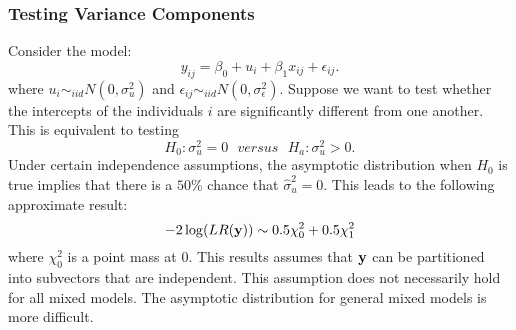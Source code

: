 \subsubsection{Testing Variance Components}
Consider the model:
 $$
y_{ij} = \beta_0 + u_i + \beta_1 x_{ij} + \epsilon_{ij}.
$$
where $u_i \sim_{iid} N(0, \sigma^2_u)$ and $\epsilon_{ij} \sim_{iid} N(0, \sigma^2_\epsilon)$.
Suppose we want to test whether the intercepts of the individuals $i$ are significantly different from one another.
This is equivalent to testing 
$$H_0: \sigma^2_u = 0 \,\,\,\, versus \,\,\,\, H_a : \sigma^2_u > 0.$$
Under certain independence assumptions, the asymptotic distribution when $H_0$ is true implies that there is a $50\%$ chance that $\hat \sigma^2_u=0$. 
This leads to the following approximate result:
$$
-2 \log(LR(\mathbf{y})) \sim 0.5 \chi^2_0 + 0.5 \chi^2_1
$$
where $\chi^2_0$ is a point mass at $0$.
This results assumes that $\mathbf{y}$ can be partitioned into subvectors that are independent.
This assumption does not necessarily hold for all mixed models.
The asymptotic distribution for general mixed models is more difficult.


%


